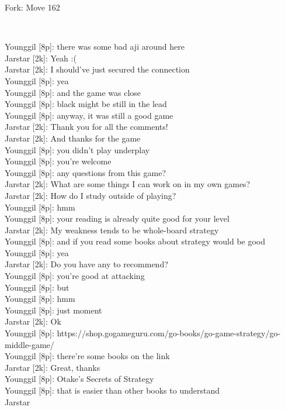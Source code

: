 \documentclass{article}
\begin{document}
\begin{subsection}{Fork: Move 162}
\begin{center}
\cleargoban
{}
\showfullgoban
\\\parbox{4.5in}{
Younggil [8p]: there was some bad aji around here\\Jarstar [2k]: Yeah :(\\Jarstar [2k]: I should've just secured the connection\\Younggil [8p]: yea\\Younggil [8p]: and the game was close\\Younggil [8p]: black might be still in the lead\\Younggil [8p]: anyway, it was still a good game\\Jarstar [2k]: Thank you for all the comments!\\Jarstar [2k]: And thanks for the game\\Younggil [8p]: you didn't play underplay\\Younggil [8p]: you're welcome\\Younggil [8p]: any questions from this game?\\Jarstar [2k]: What are some things I can work on in my own games?\\Jarstar [2k]: How do I study outside of playing?\\Younggil [8p]: hmm\\Younggil [8p]: your reading is already quite good for your level\\Jarstar [2k]: My weakness tends to be whole-board strategy\\Younggil [8p]: and if you read some books about strategy would be good\\Younggil [8p]: yea\\Jarstar [2k]: Do you have any to recommend?\\Younggil [8p]: you're good at attacking\\Younggil [8p]: but \\Younggil [8p]: hmm\\Younggil [8p]: just moment\\Jarstar [2k]: Ok\\Younggil [8p]: https://shop.gogameguru.com/go-books/go-game-strategy/go-middle-game/\\Younggil [8p]: there're some books on the link\\Jarstar [2k]: Great, thanks\\Younggil [8p]: Otake's Secrets of Strategy \\Younggil [8p]: that is easier than other books to understand\\Jarstar }
\end{center}
\end{subsection}
\end{document}
